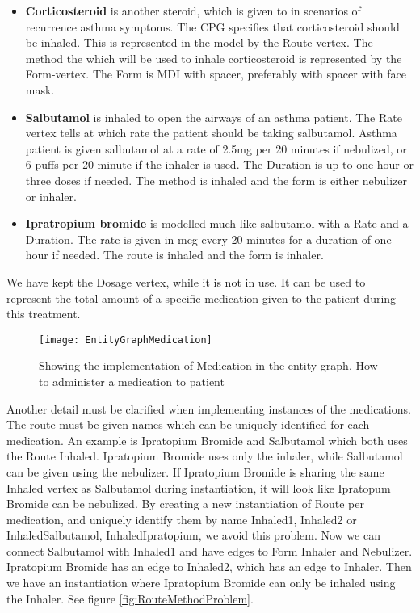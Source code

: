 \begin{itemize}
	\item \textbf{Corticosteroid} is another steroid, which is given to in scenarios of recurrence asthma symptoms. The CPG specifies that corticosteroid should be inhaled. This is represented in the model by the Route vertex. The method the which will be used to inhale corticosteroid is represented by the Form-vertex. The Form is MDI with spacer, preferably with spacer with face mask. 
	
	\item \textbf{Salbutamol} is inhaled to open the airways of an asthma patient. The Rate vertex tells at which rate the patient should be taking salbutamol. Asthma patient is given salbutamol at a rate of 2.5mg per 20 minutes if nebulized, or 6 puffs per 20 minute if the inhaler is used. The Duration is up to one hour or three doses if needed. The method is inhaled and the form is either nebulizer or inhaler.
	
	\item \textbf{Ipratropium bromide} is modelled much like salbutamol with a Rate and a Duration. The rate is given in mcg every 20 minutes for a duration of one hour if needed. The route is inhaled and the form is inhaler.
\end{itemize}

 We have kept the Dosage vertex, while it is not in use. It can be used to represent the total amount of a specific medication given to the patient during this treatment.
 

\begin{figure}[h!]
	\texttt{[image: EntityGraphMedication]}
	\caption {Showing the implementation of Medication in the entity graph. How to administer a medication to patient}
	\label{fig:EntityGraphMedication}
\end{figure}

 Another detail must be clarified when implementing instances of the medications. The route must be given names which can be uniquely identified for each medication. An example is Ipratopium Bromide and Salbutamol which both uses the Route Inhaled. Ipratopium Bromide uses only the inhaler, while Salbutamol can be given using the nebulizer. If Ipratopium Bromide is sharing the same Inhaled vertex as Salbutamol during instantiation, it will look like Ipratopum Bromide can be nebulized. By creating a new instantiation of Route per medication, and uniquely identify them by name Inhaled1, Inhaled2 or InhaledSalbutamol, InhaledIpratopium, we avoid this problem. Now we can connect Salbutamol with Inhaled1 and have edges to Form Inhaler and Nebulizer. Ipratopium Bromide has an edge to Inhaled2, which has an edge to Inhaler. Then we have an instantiation where Ipratopium Bromide can only be inhaled using the Inhaler. See figure \ref{fig:RouteMethodProblem}.


